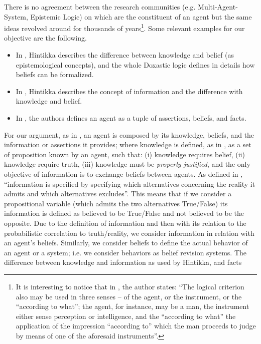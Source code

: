 \documentclass[conference]{IEEEtran}
\begin{document}
There is no agreement between the research communities (e.g.
Multi-Agent-System, Epistemic Logic) on which are the constituent of an agent
but the same ideas revolved around for thousands of years\footnote{
It is interesting to notice that 
in \autocite{Empiricus1990Pyrrhonism}, the author states: ``The logical
criterion also may be used in three senses -- of the agent, or the instrument,
or the ``according to what''; the agent, for instance, may be a man, the
instrument either sense perception or intelligence, and the ``according to
what'' the application of the impression ``according to'' which the man
proceeds to judge by means of one of the aforesaid instruments''.}.
Some relevant examples for our objective are the following.
\begin{itemize}
	\item In \autocite{Hintikka1962knowledge}, Hintikka describes the
		difference between knowledge and belief (as epistemological
		concepts), and the whole Doxastic logic defines in details how
		beliefs can be formalized.
	\item In \autocite{Hintikka1993Information}, Hintikka describes the concept
		of information and the difference with knowledge and belief.
	\item In \autocite{Santaca2016abf}, the authors defines an agent as a
		tuple of assertions, beliefs, and facts.
\end{itemize}
For our argument, as in \autocite{Santaca2016abf}, an agent is composed by its
knowledge, beliefs, and the information or assertions it provides; where
knowledge is defined, as in \autocite{Steup2020epistemology}, as a set of
proposition known by an agent, such that: (i) knowledge requires belief, (ii)
knowledge require truth, (iii) knowledge must be \emph{properly justified}, and
the only objective of information is to exchange beliefs between agents.  As
defined in \autocite{Hintikka1993Information}, ``information is specified by
specifying which alternatives concerning the reality it admits and which
alternatives excludes''. This means that if we consider a propositional
variable (which admits the two alternatives True/False) its information is
defined as believed to be True/False and not believed to be the opposite.  Due
to the definition of information and then with its relation to the
probabilistic correlation to truth/reality, we consider information in relation
with an agent's beliefs. Similarly, we consider beliefs to define the actual
behavior of an agent or a system; i.e. we consider behaviors as belief revision
systems.
The difference between knowledge and information as used by Hintikka, and facts
\end{document}
